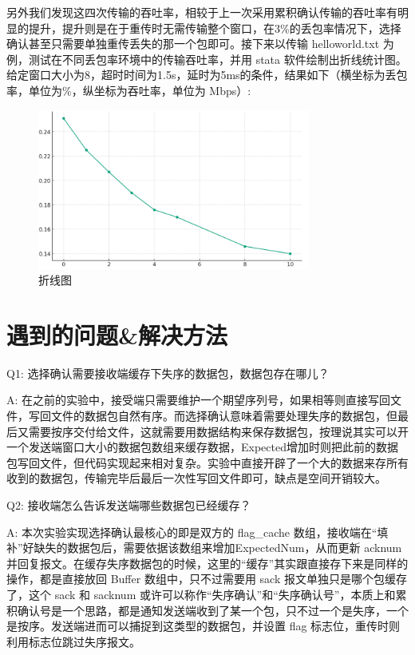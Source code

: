 \documentclass[UTF8,a4paper,10pt]{ctexart}
\begin{document}
另外我们发现这四次传输的吞吐率，相较于上一次采用累积确认传输的吞吐率有明显的提升，提升则是在于重传时无需传输整个窗口，在3\%的丢包率情况下，选择确认甚至只需要单独重传丢失的那一个包即可。接下来以传输 helloworld.txt 为例，测试在不同丢包率环境中的传输吞吐率，并用 stata 软件绘制出折线统计图。给定窗口大小为8，超时时间为1.5s，延时为5ms的条件，结果如下（横坐标为丢包率，单位为\%，纵坐标为吞吐率，单位为 Mbps）:
\begin{figure}[H]
    \centering
\includegraphics[width=0.8\textwidth]{img/折线图.png}
    \caption{折线图}
\end{figure}


\section{遇到的问题\&解决方法}

Q1: 选择确认需要接收端缓存下失序的数据包，数据包存在哪儿？\par
A: 在之前的实验中，接受端只需要维护一个期望序列号，如果相等则直接写回文件，写回文件的数据包自然有序。而选择确认意味着需要处理失序的数据包，但最后又需要按序交付给文件，这就需要用数据结构来保存数据包，按理说其实可以开一个发送端窗口大小的数据包数组来缓存数据，Expected增加时则把此前的数据包写回文件，但代码实现起来相对复杂。实验中直接开辟了一个大的数据来存所有收到的数据包，传输完毕后最后一次性写回文件即可，缺点是空间开销较大。

\vspace{1cm}

Q2: 接收端怎么告诉发送端哪些数据包已经缓存？\par
A: 本次实验实现选择确认最核心的即是双方的 flag\_cache 数组，接收端在“填补”好缺失的数据包后，需要依据该数组来增加ExpectedNum，从而更新 acknum 并回复报文。在缓存失序数据包的时候，这里的“缓存”其实跟直接存下来是同样的操作，都是直接放回 Buffer 数组中，只不过需要用 sack 报文单独只是哪个包缓存了，这个 sack 和 sacknum 或许可以称作“失序确认”和“失序确认号”，本质上和累积确认号是一个思路，都是通知发送端收到了某一个包，只不过一个是失序，一个是按序。发送端进而可以捕捉到这类型的数据包，并设置 flag 标志位，重传时则利用标志位跳过失序报文。\par
\end{document}
